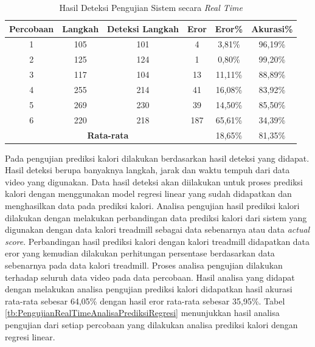 \begin{longtable}{|c|c|c|c|c|c|}
  \caption{Hasil Deteksi Pengujian Sistem secara \emph{Real Time}}
  \label{tb:PengujianRealTimeAnalisaDeteksi}                                   \\
  \hline
  \rowcolor[HTML]{C0C0C0}
  \textbf{Percobaan} & \textbf{Langkah} & \textbf{Deteksi Langkah} & \textbf{Eror} & \textbf{Eror\%} & \textbf{Akurasi\%} \\
  \hline
  1   & 105   & 101 & 4    & 3,81\%     & 96,19\%   \\
  \hline
  2   & 125   & 124 & 1    & 0,80\%     & 99,20\%   \\
  \hline
  3   & 117   & 104 & 13   & 11,11\%    & 88,89\%     \\
  \hline
  4   & 255   & 214 & 41   & 16,08\%    & 83,92\%   \\
  \hline
  5   & 269   & 230 & 39   & 14,50\%    & 85,50\%   \\
  \hline
  6   & 220   & 218 & 187  & 65,61\%    & 34,39\%   \\
  \hline

  \multicolumn{4}{|c|}{\textbf{Rata-rata}} & 18,65\% & 81,35\% \\
  \hline
\end{longtable}

Pada pengujian prediksi kalori dilakukan berdasarkan hasil deteksi yang didapat. Hasil deteksi berupa banyaknya langkah, jarak dan waktu tempuh dari data video yang digunakan. Data hasil deteksi akan diilakukan untuk proses prediksi kalori dengan menggunakan model regresi linear yang sudah didapatkan dan menghasilkan data pada prediksi kalori. Analisa pengujian hasil prediksi kalori dilakukan dengan melakukan perbandingan data prediksi kalori dari sistem yang digunakan dengan data kalori treadmill sebagai data sebenarnya atau data \emph{actual score}. Perbandingan hasil prediksi kalori dengan kalori treadmill didapatkan data eror yang kemudian dilakukan perhitungan persentase berdasarkan data sebenarnya pada data kalori treadmill. Proses analisa pengujian dilakukan terhadap seluruh data video pada data percobaan. Hasil analisa yang didapat dengan melakukan analisa pengujian prediksi kalori didapatkan hasil akurasi rata-rata sebesar 64,05\% dengan hasil eror rata-rata sebesar 35,95\%. Tabel \ref{tb:PengujianRealTimeAnalisaPrediksiRegresi} menunjukkan hasil analisa pengujian dari setiap percobaan yang dilakukan analisa prediksi kalori dengan regresi linear.


